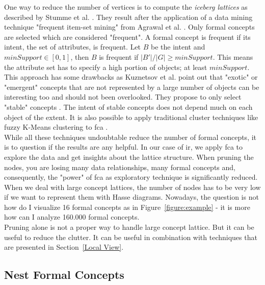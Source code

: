 \documentclass[11pt]{report}
\begin{document}
One way to reduce the number of vertices is to compute the \textit{iceberg lattices} as described by Stumme et al. \cite{Stumme2002}. They result after the application of a data mining technique "frequent item-set mining" from Agrawal et al. \cite{Agrawal1993}. Only formal concepts are selected which are considered "frequent". A formal concept is frequent if its intent, the set of attributes, is frequent. Let $B$ be the intent and $minSupport \in [0, 1]$, then $B$ is frequent if $ |B'|/|G| \geq minSupport$. This means the attribute set has to specify a high portion of objects; at least $minSupport$. This approach has some drawbacks as Kuznetsov et al. \cite{Kuznetsov20072} point out that "exotic" or "emergent" concepts that are not represented by a large number of objects can be interesting too and should not been overlooked. They propose to only select "stable" concepts \cite{Kuznetsov20072}. The intent of stable concepts does not depend much on each object of the extent. It is also possible to apply traditional cluster techniques like fuzzy K-Means clustering to \acrshort{fca} \cite{AswaniKumar2010}. \\

	While all these techniques undoubtable reduce the number of formal concepts, it is to question if the results are any helpful. In our case of \acrshort{ir}, we apply \acrshort{fca} to explore the data and get insights about the lattice structure. When pruning the nodes, you are losing many data relationships, many formal concepts and, consequently, the "power" of \acrshort{fca} as exploratory technique is significantly reduced. When we deal with large concept lattices, the number of nodes has to be very low if we want to represent them with Hasse diagrams. Nowadays, the question is not how do I visualize 16 formal concepts as in Figure~\ref{figure:example} - it is more how can I analyze 160.000 formal concepts.\\
	
	Pruning alone is not a proper way to handle large concept lattice. But it can be useful to reduce the clutter. It can be useful in combination with techniques that are presented in Section~\ref{Local View}.
	
\subsection{Nest Formal Concepts}	
\end{document}
